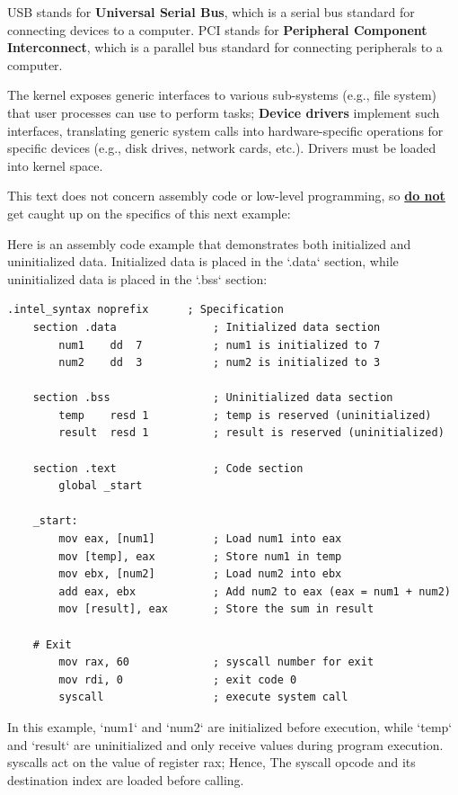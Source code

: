 \begin{Tip} USB stands for \textbf{Universal Serial Bus}, which is a serial bus standard for connecting devices to a computer.
    PCI stands for \textbf{Peripheral Component Interconnect}, which is a parallel bus standard for connecting peripherals to a computer.
\end{Tip}


\begin{Def}

  The kernel exposes generic interfaces to various sub-systems (e.g., file system) that user processes can use to perform tasks; \textbf{Device drivers} implement such interfaces,
  translating generic system calls into hardware-specific operations for specific devices (e.g., disk drives, network cards, etc.). Drivers must be loaded into kernel space.
\end{Def}

\noindent
This text does not concern assembly code or low-level programming, so \underline{\textbf{do not}} get caught up on the specifics of this next example:
\begin{Example}

    \label{ex:assembly_code}
    Here is an assembly code example that demonstrates both initialized and uninitialized data. 
    Initialized data is placed in the `.data` section, while uninitialized data is placed in the `.bss` section:

    \begin{lstlisting}[language={[x86masm]Assembler}, numbers=none]
    .intel_syntax noprefix      ; Specification 
    section .data               ; Initialized data section
        num1    dd  7           ; num1 is initialized to 7
        num2    dd  3           ; num2 is initialized to 3

    section .bss                ; Uninitialized data section
        temp    resd 1          ; temp is reserved (uninitialized)
        result  resd 1          ; result is reserved (uninitialized)

    section .text               ; Code section
        global _start

    _start:
        mov eax, [num1]         ; Load num1 into eax
        mov [temp], eax         ; Store num1 in temp
        mov ebx, [num2]         ; Load num2 into ebx
        add eax, ebx            ; Add num2 to eax (eax = num1 + num2)
        mov [result], eax       ; Store the sum in result
    
    # Exit
    	mov rax, 60             ; syscall number for exit
    	mov rdi, 0              ; exit code 0     
    	syscall                 ; execute system call
    \end{lstlisting}

    \noindent
    In this example, `num1` and `num2` are initialized before execution, while `temp` and `result` are uninitialized and only receive values during program execution.
    syscalls act on the value of register rax; Hence, The syscall opcode and its destination index are loaded before calling.
\end{Example}